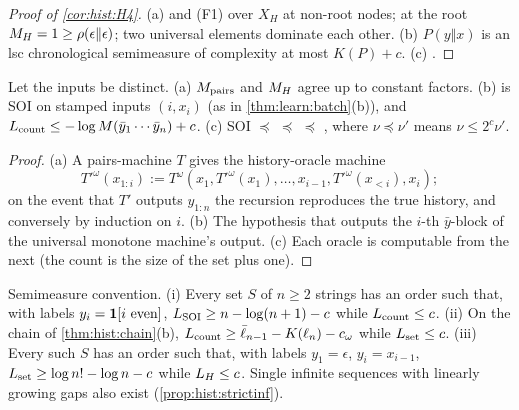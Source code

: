 \begin{proof}[Proof of \cref{cor:hist:H4}]
(a)  and (F1) over $X_H$ at non-root nodes; at the root $M_{H}=1\ge\rho(\epsilon\Vert\epsilon)$; two universal elements dominate each other. (b) $P(y\Vert x)$ is an lsc chronological semimeasure of complexity at most $K(P)+c$. (c) .
\end{proof}

\begin{proposition}\label{prop:hist:variants}
Let the inputs be distinct. (a) $M_{\mathrm{pairs}}$ and $M_{H}$ agree up to constant factors. (b) \SFIcount{} is SOI on stamped inputs $(i,x_i)$ (as in \cref{thm:learn:batch}(b)), and $L_{\rm count}\le-\log M(\bar y_1\cdots\bar y_n)+c$. (c) SOI $\preceq$ \SFIcount{} $\preceq$ \SFIset{} $\preceq$ \SFIhist{}, where $\nu\preceq\nu'$ means $\nu\le2^c\nu'$.
\end{proposition}

\begin{proof}
(a) A pairs-machine $T$ gives the history-oracle machine
\[T'^\omega(x_{1:i}):=T^\omega(x_1,T'^\omega(x_1),\dots,x_{i-1},T'^\omega(x_{<i}),x_i);\]
on the event that $T'$ outputs $y_{1:n}$ the recursion reproduces the true history, and conversely by induction on $i$. (b) The hypothesis that outputs the $i$-th $\bar y$-block of the universal monotone machine's output. (c) Each oracle is computable from the next (the count is the size of the set plus one).
\end{proof}

\begin{proposition}\label{prop:hist:strict}
Semimeasure convention. (i) Every set $S$ of $n\ge2$ strings has an order such that, with labels $y_i=\mathbf{1}[i\text{ even}]$, $L_{\mathrm{SOI}}\ge n-\log(n+1)-c$ while $L_{\rm count}\le c$. (ii) On the chain of \cref{thm:hist:chain}(b), $L_{\rm count}\ge\bar\ell_{n-1}-K(\ell_n)-c_\omega$ while $L_{\rm set}\le c$. (iii) Every such $S$ has an order such that, with labels $y_1=\epsilon$, $y_i=x_{i-1}$, $L_{\rm set}\ge\log n!-\log n-c$ while $L_{H}\le c$. Single infinite sequences with linearly growing gaps also exist (\cref{prop:hist:strictinf}).
\end{proposition}

